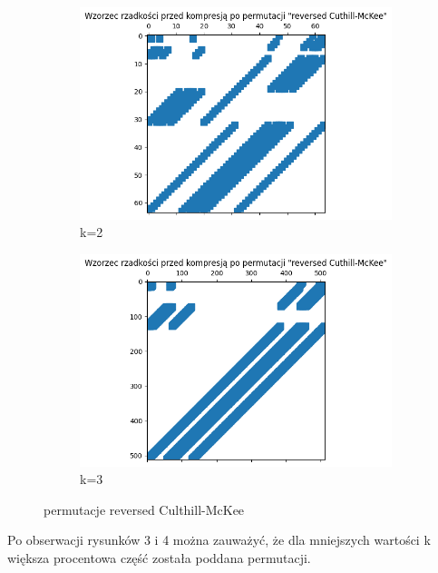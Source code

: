 \documentclass{article}
\begin{document}
\begin{figure}[htbp]
  \centering
  \begin{subfigure}[b]{0.4\textwidth}
      \includegraphics[width=\linewidth]{img/2c3k2.png}
      \caption{k=2}
      \label{fig:obraz1}
  \end{subfigure}
  \hfill
  \begin{subfigure}[b]{0.4\textwidth}
      \includegraphics[width=\linewidth]{img/2c3k3.png}
      \caption{k=3}
      \label{fig:obraz2}
  \end{subfigure}
  \caption{permutacje reversed Culthill-McKee}
  \label{fig:zestaw_obrazkow}
\end{figure}
\FloatBarrier


Po obserwacji rysunków 3 i 4 można zauważyć, że dla mniejszych wartości k większa procentowa część została poddana permutacji.
\end{document}

